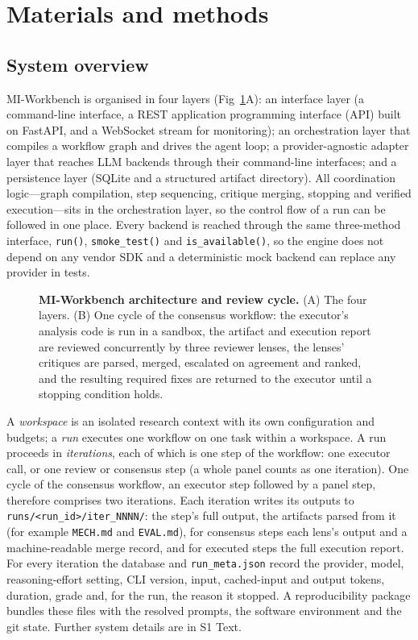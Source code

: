 \section*{Materials and methods}

\subsection*{System overview}

MI-Workbench is organised in four layers (Fig~\ref{fig1}A): an interface layer (a command-line interface, a REST application programming interface (API) built on FastAPI, and a WebSocket stream for monitoring); an orchestration layer that compiles a workflow graph and drives the agent loop; a provider-agnostic adapter layer that reaches LLM backends through their command-line interfaces; and a persistence layer (SQLite and a structured artifact directory). All coordination logic---graph compilation, step sequencing, critique merging, stopping and verified execution---sits in the orchestration layer, so the control flow of a run can be followed in one place. Every backend is reached through the same three-method interface, \texttt{run()}, \texttt{smoke\_test()} and \texttt{is\_available()}, so the engine does not depend on any vendor SDK and a deterministic mock backend can replace any provider in tests.

\begin{figure}[!h]
\caption{{\bf MI-Workbench architecture and review cycle.}
(A) The four layers. (B) One cycle of the consensus workflow: the executor's analysis code is run in a sandbox, the artifact and execution report are reviewed concurrently by three reviewer lenses, the lenses' critiques are parsed, merged, escalated on agreement and ranked, and the resulting required fixes are returned to the executor until a stopping condition holds.}
\label{fig1}
\end{figure}

A \emph{workspace} is an isolated research context with its own configuration and budgets; a \emph{run} executes one workflow on one task within a workspace. A run proceeds in \emph{iterations}, each of which is one step of the workflow: one executor call, or one review or consensus step (a whole panel counts as one iteration). One cycle of the consensus workflow, an executor step followed by a panel step, therefore comprises two iterations. Each iteration writes its outputs to \texttt{runs/<run\_id>/iter\_NNNN/}: the step's full output, the artifacts parsed from it (for example \texttt{MECH.md} and \texttt{EVAL.md}), for consensus steps each lens's output and a machine-readable merge record, and for executed steps the full execution report. For every iteration the database and \texttt{run\_meta.json} record the provider, model, reasoning-effort setting, CLI version, input, cached-input and output tokens, duration, grade and, for the run, the reason it stopped. A reproducibility package bundles these files with the resolved prompts, the software environment and the git state. Further system details are in S1 Text.

